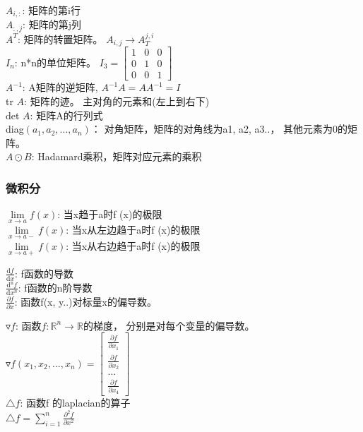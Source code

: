 \documentclass[11pt]{article}
\begin{document}
\(A_{i,:}\): 矩阵的第i行\\
\(A_{:,j}\): 矩阵的第j列\\
\(A^{T}\): 矩阵的转置矩阵。 \(A_{i, j} \rightarrow A_{T}^{j, i}\)\\
\(I_n\): n*n的单位矩阵。
\(I_3 = \begin{bmatrix}1 &0 &0 \\ 0& 1 & 0\\ 0&0 &1 \end{bmatrix}\)\\
\(A^{-1}\): A矩阵的逆矩阵, \(A^{-1}A = AA^{-1} = I\)\\
tr \(A\): 矩阵的迹。 主对角的元素和(左上到右下)\\
det \(A\): 矩阵A的行列式\\
diag\((a_1, a_2, ..., a_n)\)： 对角矩阵，矩阵的对角线为a1, a2, a3..，
其他元素为0的矩阵。\\
\(A\odot B\): Hadamard乘积，矩阵对应元素的乘积

    \subsubsection{微积分}\label{ux5faeux79efux5206}

    \(\underset{x\to a}{\lim{}}f(x)\): 当x趋于a时f (x)的极限\\
\(\underset{x\to a-}{\lim{}}f(x)\): 当x从左边趋于a时f (x)的极限\\
\(\underset{x\to a+}{\lim{}}f(x)\): 当x从右边趋于a时f (x)的极限

    \(\frac{\mathrm{d} f}{\mathrm{d} x}\): f函数的导数\\
\(\frac{\mathrm{d^n} f}{\mathrm{d} x^n}\): f函数的n阶导数\\
\(\frac{\partial f}{\partial x}\): 函数f(x, y..)对标量x的偏导数。

\(\triangledown f\): 函数\(f: \mathbb{R}^n \to \mathbb{R}\)的梯度，
分别是对每个变量的偏导数。\\
\(\triangledown f(x_1, x_2, ..., x_n) = \begin{bmatrix}\frac{\partial f}{\partial x_1}\\ \frac{\partial f}{\partial x_2}\\ ... \\\frac{\partial f}{\partial x_4}\end{bmatrix}\)\\
\(\triangle f\): 函数f 的laplacian的算子\\
\(\triangle f = \sum_{i=1}^{n}\frac{\partial^2 f}{\partial x^2}\)
\end{document}
